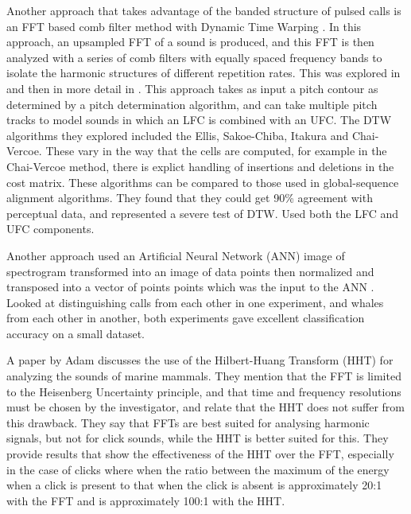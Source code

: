\documentclass[12pt,oneside]{book}
\begin{document}
Another approach that takes advantage of the banded structure of
pulsed calls is an FFT based comb filter method with Dynamic Time
Warping \cite{brown06}.  In this approach, an upsampled FFT of a sound
is produced, and this FFT is then analyzed with a series of comb
filters with equally spaced frequency bands to isolate the harmonic
structures of different repetition rates. This was explored in
\cite{brown06} and then in more detail in \cite{brown07}.  This
approach takes as input a pitch contour as determined by a pitch
determination algorithm, and can take multiple pitch tracks to model
sounds in which an LFC is combined with an UFC.  The DTW algorithms
they explored included the Ellis, Sakoe-Chiba, Itakura and
Chai-Vercoe.  These vary in the way that the cells are computed, for
example in the Chai-Vercoe method, there is explict handling of
insertions and deletions in the cost matrix.  These algorithms can be
compared to those used in global-sequence alignment algorithms.  They
found that they could get 90\% agreement with perceptual data, and
represented a severe test of DTW.  Used both the LFC and UFC
components.

Another approach used an Artificial Neural Network (ANN) image of
spectrogram transformed into an image of data points then normalized
and transposed into a vector of points points which was the input to
the ANN \cite{gaetz93}.  Looked at distinguishing calls from each
other in one experiment, and whales from each other in another, both
experiments gave excellent classification accuracy on a small dataset.

A paper by Adam \cite{adam06} discusses the use of the Hilbert-Huang
Transform (HHT) for analyzing the sounds of marine mammals.  They
mention that the FFT is limited to the Heisenberg Uncertainty
principle, and that time and frequency resolutions must be chosen by
the investigator, and relate that the HHT does not suffer from this
drawback.  They say that FFTs are best suited for analysing harmonic
signals, but not for click sounds, while the HHT is better suited for
this.  They provide results that show the effectiveness of the HHT
over the FFT, especially in the case of clicks where when the ratio
between the maximum of the energy when a click is present to that when
the click is absent is approximately 20:1 with the FFT and is
approximately 100:1 with the HHT.
\end{document}
